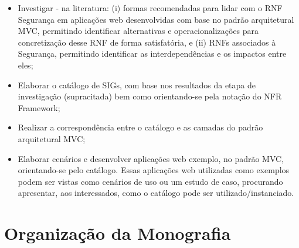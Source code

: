 \begin{itemize}
	
	\item Investigar - na literatura: (i) formas recomendadas para lidar com o RNF Segurança em aplicações web desenvolvidas com base no padrão arquitetural MVC, permitindo identificar alternativas e operacionalizações para concretização desse RNF de forma satisfatória, e (ii) RNFs associados à Segurança, permitindo identificar as interdependências e os impactos entre eles;
	
	\item Elaborar o catálogo de SIGs, com base nos resultados da etapa de investigação (supracitada) bem como orientando-se pela notação do NFR Framework;
	
	\item Realizar a correspondência entre o  catálogo e as camadas do padrão arquitetural MVC;
	
	
	\item Elaborar cenários e desenvolver aplicações web exemplo, no padrão MVC, orientando-se pelo catálogo. Essas aplicações web utilizadas como exemplos podem ser vistas como cenários de uso ou um estudo de caso, procurando apresentar, aos interessados, como o catálogo pode ser utilizado/instanciado. 
	
\end{itemize}

\section{Organização da Monografia}

